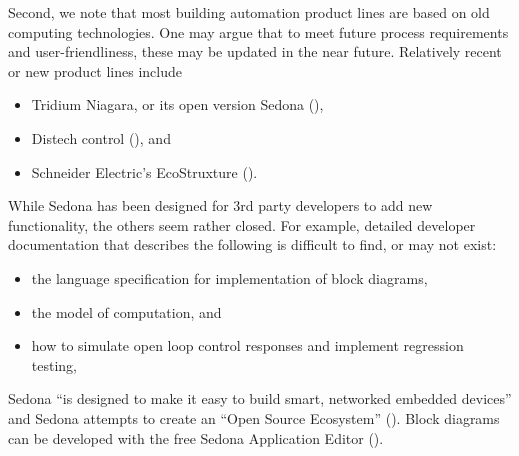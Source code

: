 \documentclass[letterpaper,10pt, openany,english]{sphinxmanual}
\begin{document}
Second, we note that most building automation product lines are based on
old computing technologies. One may argue that to meet future process
requirements and user-friendliness, these may be updated in the near future.
Relatively recent or new product lines include
\begin{itemize}
\item {} 
Tridium Niagara, or its open version Sedona (),

\item {} 
Distech control (), and

\item {} 
Schneider Electric’s EcoStruxture ().

\end{itemize}

While Sedona has been designed for 3rd party developers to add
new functionality, the others seem rather closed.
For example, detailed developer documentation that describes the following
is difficult to find, or may not exist:
\begin{itemize}
\item {} 
the language specification for implementation of block diagrams,

\item {} 
the model of computation, and

\item {} 
how to simulate open loop control responses and implement regression testing,

\end{itemize}

Sedona “is designed to make it easy to build smart, networked embedded devices”
and Sedona attempts to create an “Open Source Ecosystem” ().
Block diagrams can be developed with the free
Sedona Application Editor ().
\end{document}
